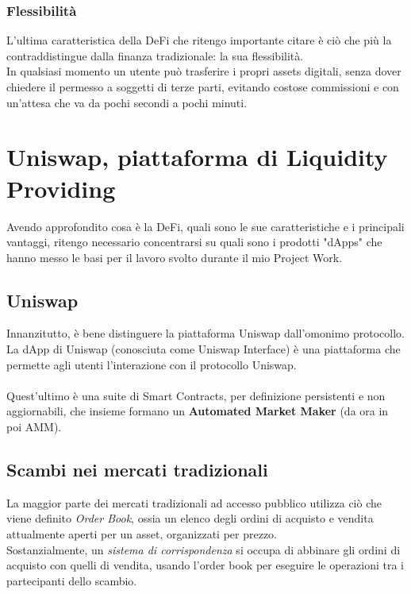 \documentclass[12pt,a4paper]{report}
\begin{document}
\subsection{Flessibilità}

L'ultima caratteristica della DeFi che ritengo importante citare è ciò che più la contraddistingue dalla finanza tradizionale: la sua flessibilità.\\
In qualsiasi momento un utente può trasferire i propri assets digitali, senza dover chiedere il permesso a soggetti di terze parti, evitando costose commissioni e con un'attesa che va da pochi secondi a pochi minuti. 


\chapter{Uniswap, piattaforma di Liquidity Providing}

Avendo approfondito cosa è la DeFi, quali sono le sue caratteristiche e i principali vantaggi, ritengo necessario concentrarsi su quali sono i prodotti "dApps" che hanno messo le basi per il lavoro svolto durante il mio Project Work.

\section{Uniswap}

Innanzitutto, è bene distinguere la piattaforma Uniswap\cite{uniswap} dall'omonimo protocollo.
\\La dApp di Uniswap (conosciuta come Uniswap Interface) è una piattaforma che permette agli utenti l'interazione con il protocollo Uniswap.
\\\\Quest'ultimo è una suite di Smart Contracts, per definizione persistenti e non aggiornabili, che insieme formano un \textbf{Automated Market Maker} (da ora in poi AMM)\cite{amm}.

\section{Scambi nei mercati tradizionali}

La maggior parte dei mercati tradizionali ad accesso pubblico utilizza ciò che viene definito \textit{Order Book}\cite{order_book}, ossia un elenco degli ordini di acquisto e vendita attualmente aperti per un asset, organizzati per prezzo.
\\Sostanzialmente, un \textit{sistema di corrispondenza}\cite{matching} si occupa di abbinare gli ordini di acquisto con quelli di vendita, usando l'order book per eseguire le operazioni tra i partecipanti dello scambio.
\end{document}
